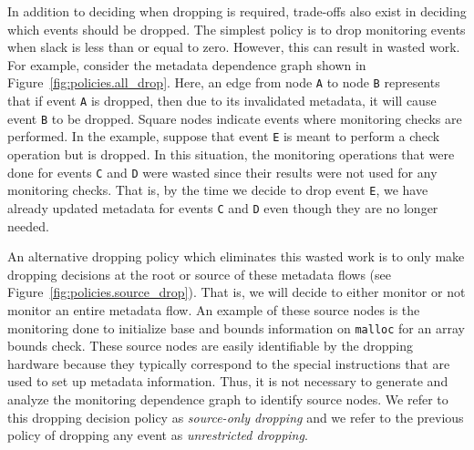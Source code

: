 In addition to deciding when dropping is required, trade-offs also exist in
deciding which events should be dropped.  The simplest policy is to drop 
monitoring events when slack is less than or equal to zero.  However, this can
result in wasted work. For example, consider the metadata dependence graph
shown in Figure~\ref{fig:policies.all_drop}. Here, an edge from node {\tt A} to
node {\tt B} represents that if event {\tt A} is dropped, then due to its
invalidated metadata, it will cause event {\tt B} to be dropped. Square nodes
indicate events where monitoring checks are performed. In the example, suppose
that event {\tt E} is meant to perform a check operation but is dropped.  In
this situation, the monitoring operations that were done for events {\tt C} and
{\tt D} were wasted since their results were not used for any monitoring
checks.  That is, by the time we decide to drop event {\tt E}, we have already
updated metadata for events {\tt C} and {\tt D} even though they are no longer
needed.

An alternative dropping policy which eliminates this wasted work is to only
make dropping decisions at the root or source of these metadata flows (see Figure~\ref{fig:policies.source_drop}). That is,
we will decide to either monitor or not monitor an entire metadata flow. An
example of these source nodes is the monitoring done to initialize base and
bounds information on {\tt malloc} for an array bounds check. These source
nodes are easily identifiable by the dropping hardware because they typically
correspond to the special instructions that are used to set up metadata
information. Thus, it is not necessary to generate and analyze the monitoring
dependence graph to identify source nodes. We refer to this dropping decision
policy as \emph{source-only
dropping} and we refer to the previous policy of dropping any event as
\emph{unrestricted dropping}.

